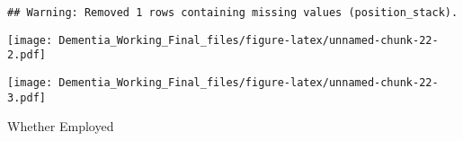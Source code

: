\documentclass[]{article}
\newenvironment{Shaded}{\begin{snugshade}}{\end{snugshade}}
\newcommand{\CommentTok}[1]{\textcolor[rgb]{0.56,0.35,0.01}{\textit{#1}}}
\newcommand{\DecValTok}[1]{\textcolor[rgb]{0.00,0.00,0.81}{#1}}
\newcommand{\KeywordTok}[1]{\textcolor[rgb]{0.13,0.29,0.53}{\textbf{#1}}}
\newcommand{\NormalTok}[1]{#1}
\newcommand{\OperatorTok}[1]{\textcolor[rgb]{0.81,0.36,0.00}{\textbf{#1}}}
\newcommand{\StringTok}[1]{\textcolor[rgb]{0.31,0.60,0.02}{#1}}
\begin{document}
\begin{verbatim}
## Warning: Removed 1 rows containing missing values (position_stack).
\end{verbatim}

\texttt{[image: Dementia\_Working\_Final\_files/figure-latex/unnamed-chunk-22-2.pdf]}

\begin{Shaded}
\end{Shaded}

\texttt{[image: Dementia\_Working\_Final\_files/figure-latex/unnamed-chunk-22-3.pdf]}

Whether Employed
\end{document}
